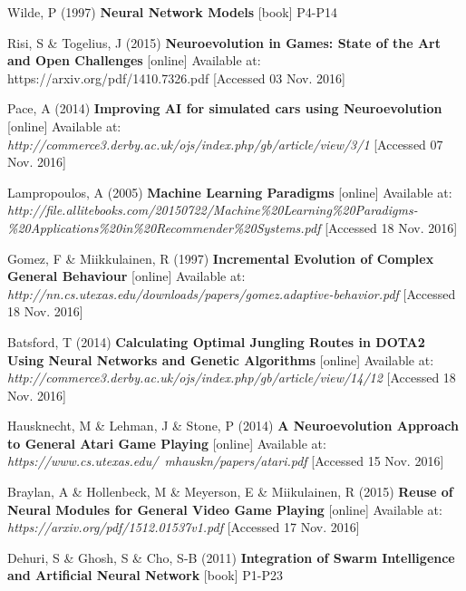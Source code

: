 \documentclass[11pt,a4paper]{article}
\begin{document}
\begin{thebibliography}{10}

	Wilde, P
	(1997)
	\textbf{Neural Network Models}
	[book]
	P4-P14

	Risi, S \& Togelius, J
	(2015)
	\textbf{Neuroevolution in Games: State of the Art and Open Challenges}
  	[online]
  	Available at: https://arxiv.org/pdf/1410.7326.pdf
  	[Accessed 03 Nov. 2016]

	Pace, A
	(2014)
	\textbf{Improving AI for simulated cars using Neuroevolution}
	[online]
	Available at: \textit{http://commerce3.derby.ac.uk/ojs/index.php/gb/article/view/3/1}
	[Accessed 07 Nov. 2016]
	
	Lampropoulos, A
	(2005)
	\textbf{Machine Learning Paradigms}
	[online]
	Available at: \textit{http://file.allitebooks.com/20150722/Machine\%20Learning\%20Paradigms-\%20Applications\%20in\%20Recommender\%20Systems.pdf}
	[Accessed 18 Nov. 2016]
  
	Gomez, F \& Miikkulainen, R
	(1997)
	\textbf{Incremental Evolution of Complex General Behaviour}
	[online]
	Available at: \textit{http://nn.cs.utexas.edu/downloads/papers/gomez.adaptive-behavior.pdf}
	[Accessed 18 Nov. 2016]
	
	Batsford, T
	(2014)
	\textbf{Calculating Optimal Jungling Routes in DOTA2 Using Neural Networks and Genetic Algorithms}
	[online]
	Available at: \textit{http://commerce3.derby.ac.uk/ojs/index.php/gb/article/view/14/12}
	[Accessed 18 Nov. 2016]
	
	Hausknecht, M \& Lehman, J \& Stone, P
	(2014)
	\textbf{A Neuroevolution Approach to General Atari Game Playing}
	[online]
	Available at: \textit{https://www.cs.utexas.edu/~mhauskn/papers/atari.pdf}
	[Accessed 15 Nov. 2016]
	
	Braylan, A \& Hollenbeck, M \& Meyerson, E \& Miikulainen, R
	(2015)
	\textbf{Reuse of Neural Modules for General Video Game Playing}
	[online]
	Available at: \textit{https://arxiv.org/pdf/1512.01537v1.pdf}
	[Accessed 17 Nov. 2016]
	
	Dehuri, S \& Ghosh, S \& Cho, S-B
	(2011)
	\textbf{Integration of Swarm Intelligence and Artificial Neural Network}
	[book]
	P1-P23

\end{thebibliography}
\end{document}
